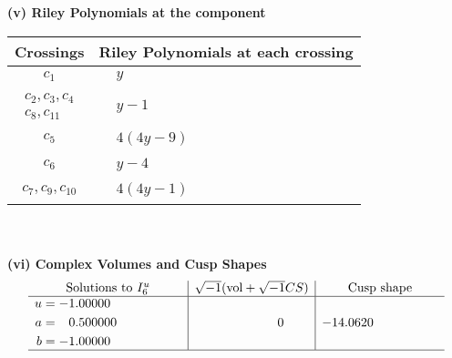 \documentclass[1p]{elsarticle_modified}
\theoremstyle{definition}
\newcommand{\I}{\sqrt{-1}}
\begin{document}
\newpage\renewcommand{\arraystretch}{1}
\flushleft \textbf{(v) Riley Polynomials at the component}\newline \\
\begin{tabular}{m{50pt}|m{274pt}}
Crossings & \hspace{64pt}Riley Polynomials at each crossing \\
\hline $$\begin{aligned}c_{1}\end{aligned}$$&$\begin{aligned}
&y
\end{aligned}$\\
\hline $$\begin{aligned}c_{2},c_{3},c_{4}\\c_{8},c_{11}\end{aligned}$$&$\begin{aligned}
&y-1
\end{aligned}$\\
\hline $$\begin{aligned}c_{5}\end{aligned}$$&$\begin{aligned}
&4(4 y-9)
\end{aligned}$\\
\hline $$\begin{aligned}c_{6}\end{aligned}$$&$\begin{aligned}
&y-4
\end{aligned}$\\
\hline $$\begin{aligned}c_{7},c_{9},c_{10}\end{aligned}$$&$\begin{aligned}
&4(4 y-1)
\end{aligned}$\\
\hline
\end{tabular}\\~\\
\newpage\flushleft \textbf{(vi) Complex Volumes and Cusp Shapes}
$$\begin{array}{c|c|c}  
\text{Solutions to }I^u_{6}& \I (\text{vol} + \sqrt{-1}CS) & \text{Cusp shape}\\
 \hline 
\begin{aligned}
u &= -1.00000\phantom{ +0.000000I} \\
a &= \phantom{-}0.500000\phantom{ +0.000000I} \\
b &= -1.00000\phantom{ +0.000000I}\end{aligned}
 & \phantom{-0.000000 } 0 & -14.0620\phantom{ +0.000000I}\\
 \hline 
 \end{array}$$\newpage\newpage\renewcommand{\arraystretch}{1}
\end{document}
